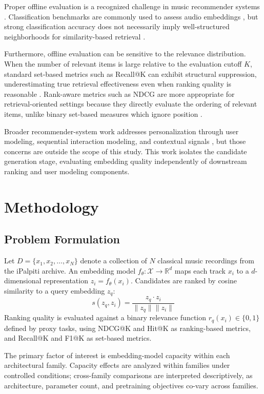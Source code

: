 \documentclass[sigconf]{acmart}
\begin{document}
Proper offline evaluation is a recognized challenge in music recommender systems \cite{schedl2018}. Classification benchmarks are commonly used to assess audio embeddings \cite{gong2021ast, zaman2023}, but strong classification accuracy does not necessarily imply well-structured neighborhoods for similarity-based retrieval \cite{tamm2024}.

Furthermore, offline evaluation can be sensitive to the relevance distribution. When the number of relevant items is large relative to the evaluation cutoff $K$, standard set-based metrics such as Recall@K can exhibit structural suppression, underestimating true retrieval effectiveness even when ranking quality is reasonable \cite{canamares2020}. Rank-aware metrics such as NDCG are more appropriate for retrieval-oriented settings because they directly evaluate the ordering of relevant items, unlike binary set-based measures which ignore position \cite{urbano2013}.

Broader recommender-system work addresses personalization through user modeling, sequential interaction modeling, and contextual signals \cite{lin2025, abbattista2024, schedl2021}, but those concerns are outside the scope of this study. This work isolates the candidate generation stage, evaluating embedding quality independently of downstream ranking and user modeling components.

\section{Methodology}\label{sec:method}\label{ch:problem}\label{ch:methodology}

\subsection{Problem Formulation}

Let $D = \{x_1, x_2, \dots, x_N\}$ denote a collection of $N$ classical music recordings from the iPalpiti archive. An embedding model $f_\theta : \mathcal{X} \rightarrow \mathbb{R}^d$ maps each track $x_i$ to a $d$-dimensional representation $z_i = f_\theta(x_i)$. Candidates are ranked by cosine similarity to a query embedding $z_q$:
\[
s(z_q, z_i) = \frac{z_q \cdot z_i}{\|z_q\|\|z_i\|}
\]
Ranking quality is evaluated against a binary relevance function $r_q(x_i) \in \{0,1\}$ defined by proxy tasks, using NDCG@K and Hit@K as ranking-based metrics, and Recall@K and F1@K as set-based metrics.

The primary factor of interest is embedding-model capacity within each architectural family. Capacity effects are analyzed within families under controlled conditions; cross-family comparisons are interpreted descriptively, as architecture, parameter count, and pretraining objectives co-vary across families.
\end{document}
